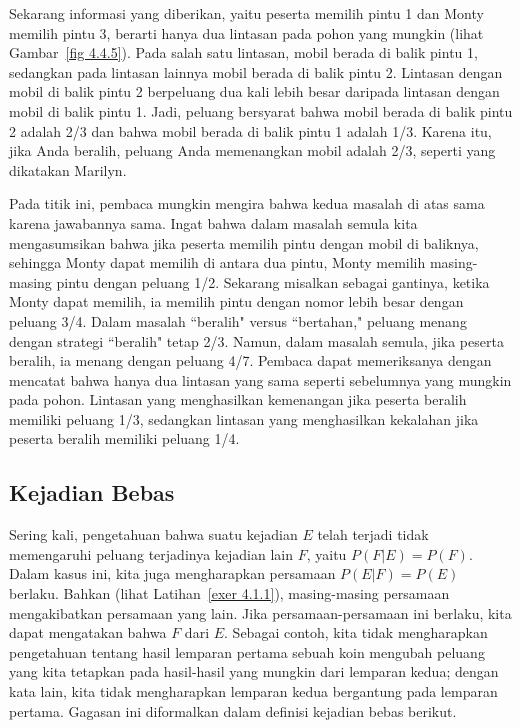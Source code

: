\begin{example}
\par
Sekarang informasi yang diberikan, yaitu peserta memilih pintu 1 dan Monty memilih pintu 3, berarti
hanya dua lintasan pada pohon yang mungkin (lihat Gambar~\ref{fig 4.4.5}).  
Pada salah satu lintasan, mobil berada di balik pintu 1, sedangkan pada lintasan lainnya mobil berada di balik pintu 2.  
Lintasan dengan mobil di balik pintu 2 berpeluang dua kali lebih besar daripada lintasan dengan mobil di balik pintu 1. 
Jadi, peluang bersyarat bahwa mobil berada di balik pintu 2 adalah 2/3 dan bahwa mobil berada 
di balik pintu 1 adalah 1/3. Karena itu, jika Anda beralih, peluang Anda memenangkan mobil adalah 2/3, seperti yang dikatakan Marilyn.
\par
Pada titik ini, pembaca mungkin mengira bahwa kedua masalah di atas sama karena jawabannya
sama.  Ingat bahwa dalam masalah semula kita mengasumsikan bahwa jika peserta
memilih pintu dengan mobil di baliknya, sehingga Monty dapat memilih di antara dua pintu, Monty memilih masing-masing pintu dengan
peluang 1/2.  Sekarang misalkan sebagai gantinya, ketika Monty dapat memilih, ia memilih pintu
dengan nomor lebih besar dengan peluang 3/4.  Dalam masalah ``beralih" versus ``bertahan,"
peluang menang dengan strategi ``beralih" tetap 2/3.  Namun, dalam
masalah semula, jika peserta beralih, ia menang dengan peluang 4/7.  Pembaca dapat
memeriksanya dengan mencatat bahwa hanya dua lintasan yang sama seperti sebelumnya yang mungkin pada pohon. 
Lintasan yang menghasilkan kemenangan jika peserta beralih memiliki peluang 1/3, sedangkan lintasan yang
menghasilkan kekalahan jika peserta beralih memiliki peluang 1/4.
\end{example}


\subsection*{Kejadian Bebas}     

Sering kali, pengetahuan bahwa suatu kejadian $E$ telah terjadi tidak memengaruhi
peluang terjadinya kejadian lain $F$, yaitu $P(F|E) = P(F)$.  Dalam
kasus ini, kita juga mengharapkan persamaan
$P(E|F) = P(E)$ berlaku.  Bahkan (lihat Latihan~\ref{exer 4.1.1}), 
masing-masing persamaan mengakibatkan persamaan yang lain.  Jika persamaan-persamaan ini berlaku, kita dapat mengatakan
bahwa $F$  dari $E$.  Sebagai contoh, kita tidak mengharapkan
pengetahuan tentang hasil lemparan pertama sebuah koin mengubah peluang
yang kita tetapkan pada hasil-hasil yang mungkin dari lemparan kedua; dengan kata lain, kita
tidak mengharapkan lemparan kedua bergantung pada lemparan pertama.  Gagasan ini
diformalkan dalam definisi kejadian bebas berikut.

